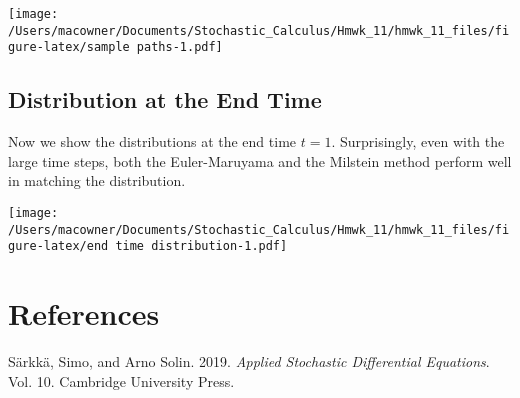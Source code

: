 \documentclass[]{article}
\newenvironment{Shaded}{\begin{snugshade}}{\end{snugshade}}
\newcommand{\CommentTok}[1]{\textcolor[rgb]{0.56,0.35,0.01}{\textit{#1}}}
\newcommand{\DecValTok}[1]{\textcolor[rgb]{0.00,0.00,0.81}{#1}}
\newcommand{\NormalTok}[1]{#1}
\newcommand{\OperatorTok}[1]{\textcolor[rgb]{0.81,0.36,0.00}{\textbf{#1}}}
\newcommand{\RegionMarkerTok}[1]{#1}
\newcommand{\StringTok}[1]{\textcolor[rgb]{0.31,0.60,0.02}{#1}}
\newcommand{\VariableTok}[1]{\textcolor[rgb]{0.00,0.00,0.00}{#1}}
\begin{document}
\texttt{[image: /Users/macowner/Documents/Stochastic\_Calculus/Hmwk\_11/hmwk\_11\_files/figure-latex/sample paths-1.pdf]}

\hypertarget{distribution-at-the-end-time}{%
\subsection{Distribution at the End
Time}\label{distribution-at-the-end-time}}

Now we show the distributions at the end time \(t=1\). Surprisingly,
even with the large time steps, both the Euler-Maruyama and the Milstein
method perform well in matching the distribution.

\begin{Shaded}
\end{Shaded}

\texttt{[image: /Users/macowner/Documents/Stochastic\_Calculus/Hmwk\_11/hmwk\_11\_files/figure-latex/end time distribution-1.pdf]}

\hypertarget{references}{%
\section*{References}\label{references}}

\hypertarget{refs}{}
\leavevmode\hypertarget{ref-sarkka2019applied}{}%
Särkkä, Simo, and Arno Solin. 2019. \emph{Applied Stochastic
Differential Equations}. Vol. 10. Cambridge University Press.
\end{document}
